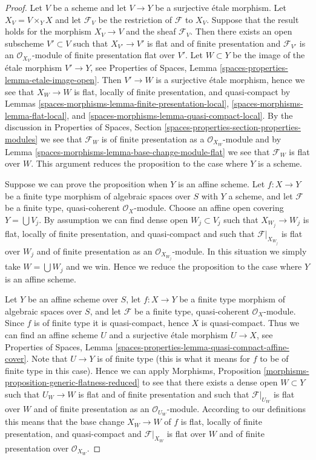 \begin{proof}
Let $V$ be a scheme and let $V \to Y$ be a surjective \'etale morphism.
Let $X_V = V \times_Y X$ and let $\mathcal{F}_V$ be the restriction of
$\mathcal{F}$ to $X_V$. Suppose that the result holds for the morphism
$X_V \to V$ and the sheaf $\mathcal{F}_V$. Then there exists an open subscheme
$V' \subset V$ such that $X_{V'} \to V'$ is flat and of finite presentation
and $\mathcal{F}_{V'}$ is an $\mathcal{O}_{X_{V'}}$-module of finite
presentation flat over $V'$. Let $W \subset Y$ be the image of
the \'etale morphism $V' \to Y$, see
Properties of Spaces, Lemma \ref{spaces-properties-lemma-etale-image-open}.
Then $V' \to W$ is a surjective \'etale morphism, hence we see that
$X_W \to W$ is flat, locally of finite presentation, and quasi-compact by
Lemmas \ref{spaces-morphisms-lemma-finite-presentation-local},
\ref{spaces-morphisms-lemma-flat-local}, and
\ref{spaces-morphisms-lemma-quasi-compact-local}.
By the discussion in
Properties of Spaces, Section
\ref{spaces-properties-section-properties-modules}
we see that $\mathcal{F}_W$ is of finite presentation as a
$\mathcal{O}_{X_W}$-module and by
Lemma \ref{spaces-morphisms-lemma-base-change-module-flat}
we see that $\mathcal{F}_W$ is flat over $W$. This argument
reduces the proposition to the case where $Y$ is a scheme.

\medskip\noindent
Suppose we can prove the proposition when $Y$ is an affine scheme.
Let $f : X \to Y$ be a finite type morphism of algebraic spaces
over $S$ with $Y$ a scheme, and let $\mathcal{F}$ be a finite type,
quasi-coherent $\mathcal{O}_X$-module. Choose an affine open covering
$Y = \bigcup V_j$. By assumption we can find dense open $W_j \subset V_j$
such that $X_{W_j} \to W_j$ is flat, locally of finite presentation, and
quasi-compact and such that $\mathcal{F}|_{X_{W_j}}$ is flat over $W_j$
and of finite presentation as an $\mathcal{O}_{X_{W_j}}$-module. In this
situation we simply take $W = \bigcup W_j$ and we win. Hence we reduce
the proposition to the case where $Y$ is an affine scheme.

\medskip\noindent
Let $Y$ be an affine scheme over $S$, let
$f : X \to Y$ be a finite type morphism of algebraic spaces
over $S$, and let $\mathcal{F}$ be a finite type,
quasi-coherent $\mathcal{O}_X$-module. Since $f$ is of finite type
it is quasi-compact, hence $X$ is quasi-compact. Thus we can find
an affine scheme $U$ and a surjective \'etale morphism $U \to X$, see
Properties of Spaces, Lemma
\ref{spaces-properties-lemma-quasi-compact-affine-cover}.
Note that $U \to Y$ is of finite type (this is what it means for
$f$ to be of finite type in this case). Hence we can apply
Morphisms, Proposition \ref{morphisms-proposition-generic-flatness-reduced}
to see that there exists a dense open $W \subset Y$ such that
$U_W \to W$ is flat and of finite presentation and such that
$\mathcal{F}|_{U_W}$ is flat over $W$ and of finite presentation
as an $\mathcal{O}_{U_W}$-module. According to our definitions this means that
the base change $X_W \to W$ of $f$ is flat, locally of finite presentation,
and quasi-compact and $\mathcal{F}|_{X_W}$ is flat over $W$ and of
finite presentation over $\mathcal{O}_{X_W}$.
\end{proof}

